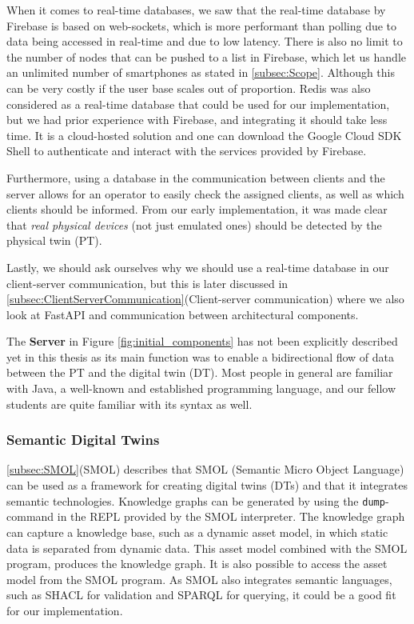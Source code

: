 \documentclass{article}
\begin{document}
When it comes to real-time databases, we saw that the real-time database by Firebase is based on web-sockets, which is more performant than polling due to data being accessed in real-time and due to low latency. There is also no limit to the number of nodes that can be pushed to a list in Firebase, which let us handle an unlimited number of smartphones as stated in \ref{subsec:Scope}. Although this can be very costly if the user base scales out of proportion. Redis was also considered as a real-time database that could be used for our implementation, but we had prior experience with Firebase, and integrating it should take less time. It is a cloud-hosted solution \cite{noauthor_firebase_nodate} and one can download the Google Cloud SDK Shell to authenticate and interact with the services provided by Firebase.

Furthermore, using a database in the communication between clients and the server allows for an operator to easily check the assigned clients, as well as which clients should be informed. From our early implementation, it was made clear that \emph{real physical devices} (not just emulated ones) should be detected by the physical twin (PT). 

Lastly, we should ask ourselves why we should use a real-time database in our client-server communication, but this is later discussed in \ref{subsec:ClientServerCommunication}(Client-server communication) where we also look at FastAPI and communication between architectural components.

The \textbf{Server} in Figure \ref{fig:initial_components} has not been explicitly described yet in this thesis as its main function was to enable a bidirectional flow of data between the PT and the digital twin (DT). Most people in general are familiar with Java,  a well-known and established programming language, and our fellow students are quite familiar with its syntax as well.

\subsubsection{Semantic Digital Twins}\label{subsubsection:SemanticDigitalTwins}
\ref{subsec:SMOL}(SMOL) describes that SMOL (Semantic Micro Object Language) can be used as a framework for creating digital twins (DTs) and that it integrates semantic technologies. Knowledge graphs can be generated by using the \verb|dump|-command in the REPL provided by the SMOL interpreter. The knowledge graph can capture a knowledge base, such as a dynamic asset model, in which static data is separated from dynamic data. This asset model combined with the SMOL program, produces the knowledge graph. It is also possible to access the asset model from the SMOL program. As SMOL also integrates semantic languages, such as SHACL for validation and SPARQL for querying, it could be a good fit for our implementation.
\end{document}
